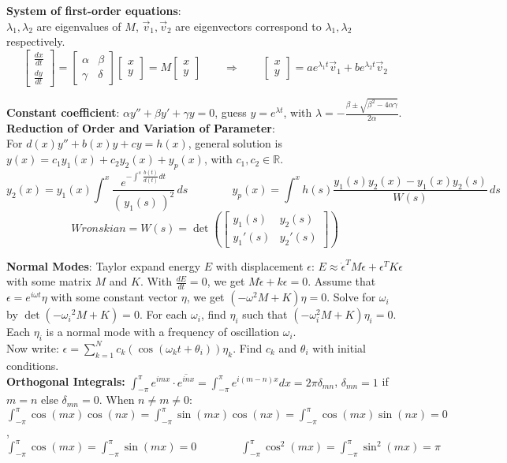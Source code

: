 \documentclass[11pt]{article}
\theoremstyle{break}
\theoremstyle{break}
\newcommand{\R}{\mathbb{R}}
\newcommand{\bmat}[1]{\begin{bmatrix}
#1\end{bmatrix}}
\begin{document}
\textbf{System of first-order equations}: \\$\lambda_1,\lambda_2$ are eigenvalues of $M$, $\vec{v}_1,\vec{v}_2$ are eigenvectors correspond to $\lambda_1,\lambda_2$ respectively. 
$$\bmat{\frac{dx}{dt}\\\frac{dy}{dt}} = \bmat{\alpha & \beta \\ \gamma & \delta}\bmat{x \\ y}=M\bmat{x \\ y}\qquad\Rightarrow \qquad \bmat{x\\y} = ae^{\lambda_1 t}\vec{v}_1 + be^{\lambda_2 t} \vec{v}_2$$

\textbf{Constant coefficient}:
$\alpha y'' + \beta y' + \gamma y = 0$, guess $y = e^{\lambda t}$, with $\lambda = -\frac{\beta \pm \sqrt{\beta^2 -4\alpha \gamma}}{2\alpha}$. \\

\textbf{Reduction of Order and Variation of Parameter}:\\
For $d(x)y'' + b(x) y + cy = h(x)$, general solution is $y(x) = c_1 y_1(x) + c_2y_2(x) + y_p(x)$, with $c_1,c_2 \in \R$.\\
$$y_2(x)=y_1(x) \int^x \frac{e^{-\int^s \frac{b(t)}{d(t)}dt}}{(\, y_1(s)\, )^2}\, ds\qquad\qquad y_p(x) = \int^x h(s)\frac{y_1(s)y_2(x) - y_1(x)y_2(s)}{W(s)}\, ds$$
$$Wronskian = W(s) = \det\left(\bmat{y_1(s) & y_2(s) \\ y_1'(s) &y_2'(s)}\right)$$


\textbf{Normal Modes}: Taylor expand energy $E$ with displacement $\epsilon$: $E \approx \dot{\epsilon}^T M \dot{\epsilon}  + \epsilon^T K \epsilon$ with some matrix $M$ and $K$. With $\frac{dE}{dt} = 0$, we get $M\ddot{\epsilon}+k\epsilon = 0$. Assume that $\epsilon = e^{i\omega t} \eta$ with some constant vector $\eta$, we get $(-\omega^2 M+K)\eta = 0$. Solve for $\omega_i$ by $\det(-{\omega_i}^2 M +K) = 0$. For each $\omega_i$, find $\eta_i$ such that $(-\omega_i^2 M + K) \eta_i = 0$. Each $\eta_i$ is a normal mode with a frequency of oscillation $\omega_i$.\\ Now write: $\epsilon = \sum_{k=1}^N c_k (\cos(\omega_k t +\theta_i)) \eta_k$. Find $c_k$ and $\theta_i$ with initial conditions. \\

\textbf{Orthogonal Integrals:} $\int_{-\pi}^{\pi} e^{imx}\cdot  \overline{e^{inx}} = \int_{-\pi}^{\pi}e^{i(m-n)x}dx = 2\pi \delta_{mn}$, $\delta_{mn}=1$ if $m=n$ else $\delta_{mn}=0$. 
When $n\neq m \neq 0$:
$\int_{-\pi}^\pi \cos(mx)\cos(nx) = \int_{-\pi}^\pi \sin(mx)\cos(nx) = \int_{-\pi}^\pi \cos(mx)\sin(nx)=0$,\\
$\int_{-\pi}^\pi \cos(mx) = \int_{-\pi}^\pi \sin(mx)=0 \qquad\qquad\int_{-\pi}^\pi \cos^2(mx) = \int_{-\pi}^\pi \sin^2(mx) = \pi$\\
\end{document}
